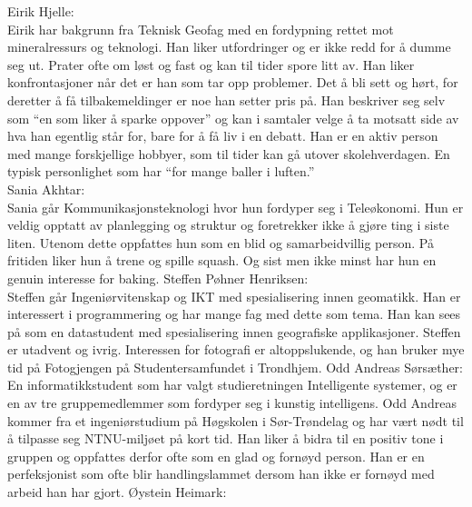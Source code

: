 \documentclass[a4paper,norsk,oneside]{article}
\begin{document}
Eirik Hjelle:\\
Eirik har bakgrunn fra Teknisk Geofag med en fordypning rettet mot mineralressurs og teknologi. Han liker utfordringer og er ikke redd for å dumme seg ut. Prater ofte om løst og fast og kan til tider spore litt av. Han liker konfrontasjoner når det er han som tar opp problemer. Det å bli sett og hørt, for deretter å få tilbakemeldinger er noe han setter pris på. Han beskriver seg selv som “en som liker å sparke oppover” og kan i samtaler velge å ta motsatt side av hva han egentlig står for, bare for å få liv i en debatt. Han er en aktiv person med mange forskjellige hobbyer, som til tider kan gå utover skolehverdagen. En typisk personlighet som har “for mange baller i luften.”   \\
\newline
\newline
Sania Akhtar:\\
Sania går Kommunikasjonsteknologi hvor hun fordyper seg i Teleøkonomi. Hun er veldig opptatt av planlegging og struktur og foretrekker ikke å gjøre ting i siste liten. Utenom dette oppfattes hun som en blid og samarbeidvillig person. På fritiden liker hun å trene og spille squash. Og sist men ikke minst har hun en genuin interesse for baking. 	
\newline
\newline
Steffen Pøhner Henriksen:\\
Steffen går Ingeniørvitenskap og IKT med spesialisering innen geomatikk. Han er interessert i programmering og har mange fag med dette som tema. Han kan sees på som en datastudent med spesialisering innen geografiske applikasjoner. Steffen er utadvent og ivrig. Interessen for fotografi er altoppslukende, og han bruker mye tid på Fotogjengen på Studentersamfundet i Trondhjem.
\newline
\newline
Odd Andreas Sørsæther:\\
En informatikkstudent som har valgt studieretningen Intelligente systemer, og er en av tre gruppemedlemmer som fordyper seg i kunstig intelligens. Odd Andreas kommer fra et ingeniørstudium på Høgskolen i Sør-Trøndelag og har vært nødt til å tilpasse seg NTNU-miljøet på kort tid. Han liker å bidra til en positiv tone i gruppen og oppfattes derfor ofte som en glad og fornøyd person. Han er en perfeksjonist som ofte blir handlingslammet dersom han ikke er fornøyd med arbeid han har gjort.
\newline
\newline
Øystein Heimark:\\
\end{document}
